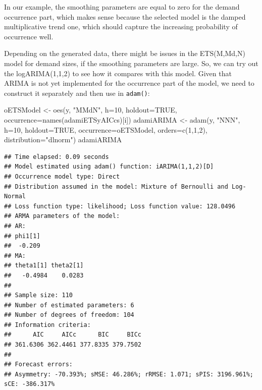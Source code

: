 \documentclass[
]{book}
\newenvironment{Shaded}{\begin{snugshade}}{\end{snugshade}}
\newcommand{\AttributeTok}[1]{\textcolor[rgb]{0.77,0.63,0.00}{#1}}
\newcommand{\ConstantTok}[1]{\textcolor[rgb]{0.00,0.00,0.00}{#1}}
\newcommand{\DecValTok}[1]{\textcolor[rgb]{0.00,0.00,0.81}{#1}}
\newcommand{\FunctionTok}[1]{\textcolor[rgb]{0.00,0.00,0.00}{#1}}
\newcommand{\NormalTok}[1]{#1}
\newcommand{\OtherTok}[1]{\textcolor[rgb]{0.56,0.35,0.01}{#1}}
\newcommand{\StringTok}[1]{\textcolor[rgb]{0.31,0.60,0.02}{#1}}
\theoremstyle{definition}
\theoremstyle{definition}
\theoremstyle{definition}
\theoremstyle{definition}
\theoremstyle{remark}
\begin{document}
In our example, the smoothing parameters are equal to zero for the demand occurrence part, which makes sense because the selected model is the damped multiplicative trend one, which should capture the increasing probability of occurrence well.

Depending on the generated data, there might be issues in the ETS(M,Md,N) model for demand sizes, if the smoothing parameters are large. So, we can try out the logARIMA(1,1,2) to see how it compares with this model. Given that ARIMA is not yet implemented for the occurrence part of the model, we need to construct it separately and then use in \texttt{adam()}:

\begin{Shaded}
\begin{Highlighting}[]
\NormalTok{oETSModel }\OtherTok{\textless{}{-}} \FunctionTok{oes}\NormalTok{(y, }\StringTok{"MMdN"}\NormalTok{, }\AttributeTok{h=}\DecValTok{10}\NormalTok{, }\AttributeTok{holdout=}\ConstantTok{TRUE}\NormalTok{,}
                 \AttributeTok{occurrence=}\FunctionTok{names}\NormalTok{(adamiETSyAICcs)[i])}
\NormalTok{adamiARIMA }\OtherTok{\textless{}{-}} \FunctionTok{adam}\NormalTok{(y, }\StringTok{"NNN"}\NormalTok{, }\AttributeTok{h=}\DecValTok{10}\NormalTok{, }\AttributeTok{holdout=}\ConstantTok{TRUE}\NormalTok{,}
                   \AttributeTok{occurrence=}\NormalTok{oETSModel,}
                   \AttributeTok{orders=}\FunctionTok{c}\NormalTok{(}\DecValTok{1}\NormalTok{,}\DecValTok{1}\NormalTok{,}\DecValTok{2}\NormalTok{),}
                   \AttributeTok{distribution=}\StringTok{"dlnorm"}\NormalTok{)}
\NormalTok{adamiARIMA}
\end{Highlighting}
\end{Shaded}

\begin{verbatim}
## Time elapsed: 0.09 seconds
## Model estimated using adam() function: iARIMA(1,1,2)[D]
## Occurrence model type: Direct
## Distribution assumed in the model: Mixture of Bernoulli and Log-Normal
## Loss function type: likelihood; Loss function value: 128.0496
## ARMA parameters of the model:
## AR:
## phi1[1] 
##  -0.209 
## MA:
## theta1[1] theta2[1] 
##   -0.4984    0.0283 
## 
## Sample size: 110
## Number of estimated parameters: 6
## Number of degrees of freedom: 104
## Information criteria:
##      AIC     AICc      BIC     BICc 
## 361.6306 362.4461 377.8335 379.7502 
## 
## Forecast errors:
## Asymmetry: -70.393%; sMSE: 46.286%; rRMSE: 1.071; sPIS: 3196.961%; sCE: -386.317%
\end{verbatim}
\end{document}
